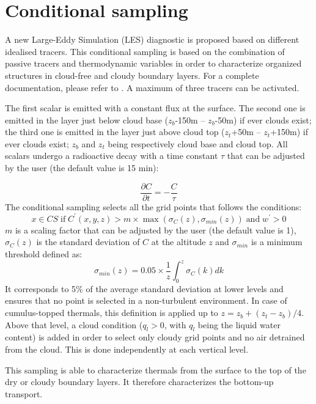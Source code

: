 \section{Conditional sampling}
%
A new Large-Eddy Simulation (LES) diagnostic is proposed based on different idealised tracers. This conditional sampling is based on the combination of passive tracers and thermodynamic variables in order to characterize organized structures in cloud-free and cloudy boundary layers. For a complete documentation, please refer to \citet{Couvreux2010a}. %
A maximum of three tracers can be activated.

The first scalar is emitted with a constant flux at the surface. The second one is emitted in the layer just below cloud base ($z_b$-150m -- $z_b$-50m) if ever clouds exist; the third one is emitted in the layer just above cloud top ($z_t$+50m -- $z_t$+150m) if ever clouds exist; $z_b$ and $z_t$ being respectively cloud base and cloud top.  All scalars undergo a radioactive decay with a time constant $\tau$ that can be adjusted by the user (the default value is 15 min):

\begin{equation}
\frac{\partial C}{\partial t}=- \frac{C}{\tau}
\end{equation}
The conditional sampling selects all the grid points that follows the conditions:
\begin{equation}
x \in CS \;\mbox{if}\; C^{'}(x,y,z) > m \times \max(\sigma_{C}(z),\sigma_{min}(z)) \;\mbox{and}\; w^{'}>0
\end{equation}
$m$ is a scaling factor that can be adjusted by the user (the default value is 1),
$\sigma_{C}(z)$ is the standard deviation of $C$ at the altitude $z$ and
$\sigma_{min}$ is a minimum threshold defined as:
\begin{equation}
\sigma_{min}(z)=0.05 \times \frac{1}{z} \int_0^z \sigma_{C}(k) dk
\end{equation}
It corresponds to 5\% of the average standard deviation at lower levels and ensures that no point is selected in a non-turbulent environment.
In case of cumulus-topped thermals, this definition is applied up to $z=z_b+(z_t-z_b)/4$. Above that level, a cloud condition ($q_l>0$, with $q_l$ being the liquid water content) is added in order to select only cloudy grid points and no air detrained from the cloud.
This is done independently at each vertical level.

This sampling is able to characterize thermals from the surface to the top of the dry or cloudy boundary layers. It therefore characterizes the bottom-up transport. 


